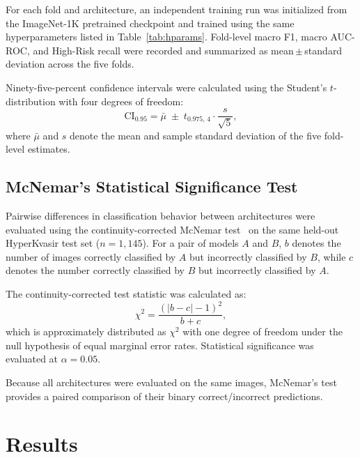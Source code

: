 \documentclass[11pt,a4paper]{article}
\begin{document}
For each fold and architecture, an independent training run was initialized
from the ImageNet-1K pretrained checkpoint and trained using the same
hyperparameters listed in Table~\ref{tab:hparams}. Fold-level
macro F1, macro AUC-ROC, and High-Risk recall were recorded and
summarized as mean\,$\pm$\,standard deviation across the five folds.

Ninety-five-percent confidence intervals were calculated using the Student's
$t$-distribution with four degrees of freedom:
\begin{equation}
  \text{CI}_{0.95} =
    \bar{\mu} \;\pm\; t_{0.975,\,4}\cdot\frac{s}{\sqrt{5}},
  \label{eq:ci}
\end{equation}
where $\bar{\mu}$ and $s$ denote the mean and sample standard deviation of
the five fold-level estimates.

\subsection{McNemar's Statistical Significance Test}
\label{sec:mcnemar_methods}

Pairwise differences in classification behavior between architectures were
evaluated using the continuity-corrected McNemar test~\citep{McNemar1947}
on the same held-out HyperKvasir test set ($n=1{,}145$). For a pair of
models $A$ and $B$, $b$ denotes the number of images correctly classified
by $A$ but incorrectly classified by $B$, while $c$ denotes the number
correctly classified by $B$ but incorrectly classified by $A$.

The continuity-corrected test statistic was calculated as:
\begin{equation}
  \chi^2 = \frac{(|b - c| - 1)^2}{b + c},
  \label{eq:mcnemar}
\end{equation}
which is approximately distributed as $\chi^2$ with one degree of freedom
under the null hypothesis of equal marginal error rates. Statistical
significance was evaluated at $\alpha=0.05$.

Because all architectures were evaluated on the same images, McNemar's
test provides a paired comparison of their binary correct/incorrect
predictions.

\section{Results}
\label{sec:results}
\end{document}
